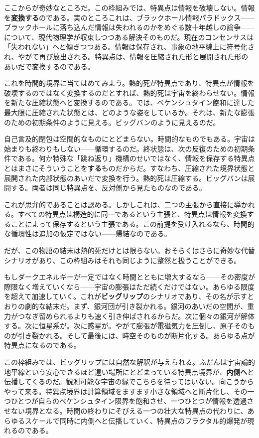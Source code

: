 \documentclass[11pt, twoside, openright]{book}
\begin{document}
ここからが奇妙なところだ。この枠組みでは、特異点は情報を破壊しない。情報を\textbf{変換する}のである。実のところこれは、ブラックホール情報パラドックス------ブラックホールに落ち込んだ情報は失われるのかをめぐる数十年越しの論争------について、現代物理学が収束しつつある解決そのものだ。現在のコンセンサスは「失われない」へと傾きつつある。情報は保存され、事象の地平線上に符号化され、やがて再び放出される。特異点は、情報を圧縮された形と展開された形のあいだで変換するのである。

これを時間的境界に当てはめてみよう。熱的死が特異点であり、特異点が情報を破壊するのではなく変換するのだとすれば、熱的死は宇宙を終わらせない。情報を新たな圧縮状態へと変換するのである。では、ベケンシュタイン飽和に達した最大限に圧縮された状態とは、どのような姿をしているか。それは、新たな膨張のための初期条件のように見える。ビッグバンのように見えるのだ。

自己言及的閉包は空間的なものにとどまらない。時間的なものでもある。宇宙は始まりも終わりもしない------循環するのだ。終状態は、次の反復のための初期条件である。何か特殊な「跳ね返り」機構のせいではなく、情報を保存する特異点とはまさにそういうことを\textbf{する}ものだからだ。すなわち、圧縮された境界状態と展開された内部状態のあいだで変換を行う。熱的死は圧縮する。ビッグバンは展開する。両者は同じ特異点を、反対側から見たものなのである。

これが思弁的であることは認める。しかしこれは、二つの主張から直接に導かれる。すべての特異点は構造的に同一であるという主張と、特異点は情報を変換することによって保存するという主張である。この前提を受け入れるなら、時間的な循環性は追加の仮定ではない------帰結なのである。

だが、この物語の結末は熱的死だけとは限らない。おそらくはさらに奇妙な代替シナリオがあり、この枠組みはそれも同じように整然と扱うことができる。

もしダークエネルギーが一定ではなく時間とともに増大するなら------その密度が際限なく増えていくなら------宇宙の膨張はただ続くだけではない。あらゆる限度を超えて加速していく。これが\textbf{ビッグリップ}のシナリオであり、その名が示すとおりの劇的な結末だ。まず、銀河団が引き裂かれる。銀河のあいだの空間が、重力がつなぎ留められるよりも速く引き伸ばされるからだ。次に個々の銀河が解体する。次に恒星系が。次に惑星が。やがて膨張が電磁気力を圧倒し、原子そのものが引き裂かれる。そして最後には、時空そのものが断片化する。あらゆる点が特異点になるのである。

この枠組みでは、ビッグリップには自然な解釈が与えられる。ふだんは宇宙論的地平線という安心できるほど遠い場所にとどまっている特異点境界が、\textbf{内側へ}と伝播してくるのだ。観測可能な宇宙の縁でこちらを待ってはいない。向こうからやって来る。特異点境界は計算領域をますます小さな領域へと断片化し、その一つひとつが自らのベケンシュタイン限界を飽和させ、一つひとつが情報を透過させない境界となる。時間の終わりにそびえる一つの壮大な特異点の代わりに、あらゆるスケールで同時に内側へと伝播していく、特異点のフラクタル的爆発が現れるのである。
\end{document}
